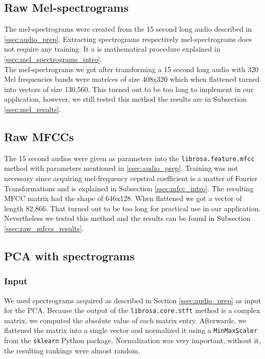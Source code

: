 \subsection{Raw Mel-spectrograms}\label{ssec:raw_mels_experiments}
The mel-spectrograms were created from the 15 second long audio described in \ref{ssec:audio_prep}. Extracting spectrograms respectively mel-spectrograms does not require any training. It a is mathematical procedure explained in \ref{ssec:mel_spectrograms_intro}. \\
The mel-spectrograms we got after transforming a 15 second long audio with 320 Mel frequencies bands were matrices of size 408x320 which when flattened turned into vectors of size 130,560. This turned out to be too long to implement in our application, however, we still tested this method the results are in Subsection \ref{ssec:mel_results}. \\

\subsection{Raw MFCCs}\label{ssec:raw_mfccs_experiments}
The 15 second audios were given as parameters into the \texttt{librosa.feature.mfcc} method with parameters mentioned in \ref{ssec:audio_prep}. Training was not necessary since acquiring mel-frequency cepstral coefficient is a matter of Fourier Transformations and is explained in Subsection  \ref{ssec:mfcc_intro}. The resulting MFCC matrix had the shape of 646x128. When flattened we got a vector of length 82,866. That turned out to be too long for practical use in our application. Nevertheless we tested this method and the results can be found in Subsection \ref{ssec:raw_mfccs_results}.

\subsection{PCA with spectrograms}\label{ssec:PCA_spec_experiments}

\subsubsection{Input}
We used spectrograms acquired as described in Section \ref{ssec:audio_prep} as input for the PCA. Because the output of the \texttt{librosa.core.stft} method is a complex matrix, we computed the absolute value of each matrix entry. Afterwards, we flattened the matrix into a single vector and normalized it using a \texttt{MinMaxScaler} from the \texttt{sklearn} Python package. Normalization was very important, without it, the resulting rankings were almost random.

